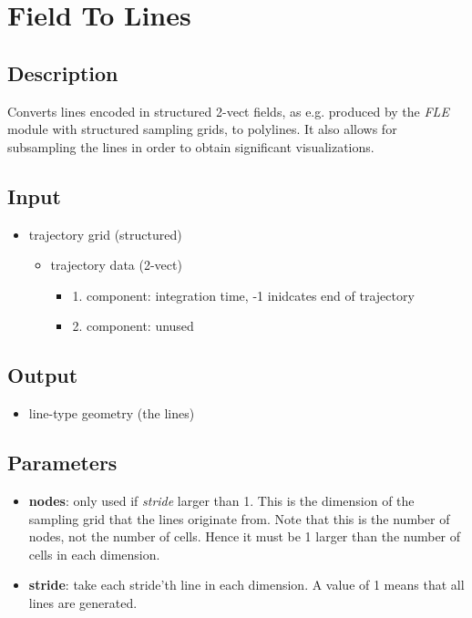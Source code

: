 \section{Field To Lines}
\label{sec:field-to-lines}


\subsection{Description}
Converts lines encoded in structured 2-vect fields, as e.g. produced by the \emph{FLE} module with structured sampling grids, to polylines. It also allows for subsampling the lines in order to obtain significant visualizations.
 

\subsection{Input}
\begin{itemize}
\item
  trajectory grid (structured)
  \begin{itemize}
  \item
    trajectory data (2-vect)
    \begin{itemize}
    \item
      1. component: integration time, -1 inidcates end of trajectory
    \item
      2. component: unused
    \end{itemize}
  \end{itemize}
\end{itemize}


\subsection{Output}
\begin{itemize}
\item
  line-type geometry (the lines)
\end{itemize}


\subsection{Parameters}
\begin{itemize}

\item
  \textbf{nodes}: only used if \emph{stride} larger than 1. This is the dimension of the sampling grid that the lines originate from. Note that this is the number of nodes, not the number of cells. Hence it must be 1 larger than the number of cells in each dimension.

\item
  \textbf{stride}: take each stride'th line in each dimension. A value of 1 means that all lines are generated.

\end{itemize}


